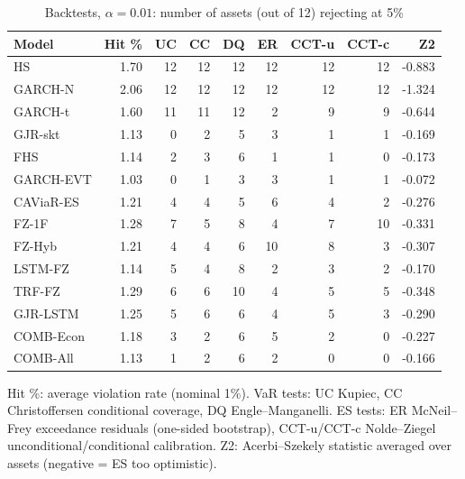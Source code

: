\begin{table}[htbp]
\centering
\footnotesize
\caption{Backtests, $\alpha=0.01$: number of assets (out of 12) rejecting at 5\%}
\label{tab:bt_a010}
\begin{tabular}{lrrrrrrrr}
\toprule
Model & Hit \% & UC & CC & DQ & ER & CCT-u & CCT-c & Z2 \\
\midrule
HS & 1.70 & 12 & 12 & 12 & 12 & 12 & 12 & -0.883 \\
GARCH-N & 2.06 & 12 & 12 & 12 & 12 & 12 & 12 & -1.324 \\
GARCH-t & 1.60 & 11 & 11 & 12 & 2 & 9 & 9 & -0.644 \\
GJR-skt & 1.13 & 0 & 2 & 5 & 3 & 1 & 1 & -0.169 \\
FHS & 1.14 & 2 & 3 & 6 & 1 & 1 & 0 & -0.173 \\
GARCH-EVT & 1.03 & 0 & 1 & 3 & 3 & 1 & 1 & -0.072 \\
CAViaR-ES & 1.21 & 4 & 4 & 5 & 6 & 4 & 2 & -0.276 \\
FZ-1F & 1.28 & 7 & 5 & 8 & 4 & 7 & 10 & -0.331 \\
FZ-Hyb & 1.21 & 4 & 4 & 6 & 10 & 8 & 3 & -0.307 \\
LSTM-FZ & 1.14 & 5 & 4 & 8 & 2 & 3 & 2 & -0.170 \\
TRF-FZ & 1.29 & 6 & 6 & 10 & 4 & 5 & 5 & -0.348 \\
GJR-LSTM & 1.25 & 5 & 6 & 6 & 4 & 5 & 3 & -0.290 \\
COMB-Econ & 1.18 & 3 & 2 & 6 & 5 & 2 & 0 & -0.227 \\
COMB-All & 1.13 & 1 & 2 & 6 & 2 & 0 & 0 & -0.166 \\
\bottomrule
\end{tabular}
\par\smallskip\parbox{\linewidth}{\scriptsize Hit \%: average violation rate (nominal 1\%). VaR tests: UC Kupiec, CC Christoffersen conditional coverage, DQ Engle--Manganelli. ES tests: ER McNeil--Frey exceedance residuals (one-sided bootstrap), CCT-u/CCT-c Nolde--Ziegel unconditional/conditional calibration. Z2: Acerbi--Szekely statistic averaged over assets (negative = ES too optimistic).}
\end{table}